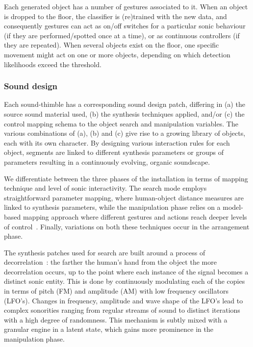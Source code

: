 \documentclass{nime-alternate}
\begin{document}
Each generated object has a number of gestures associated to it. When an object is dropped to the floor, the classifier is (re)trained with the new data, and consequently gestures can act as on/off switches for a particular sonic behaviour (if they are performed/spotted once at a time), or as continuous controllers (if they are repeated). When several objects exist on the floor, one specific movement might act on one or more objects, depending on which detection likelihoods exceed the threshold. 


\subsubsection{Sound design}


Each sound-thimble has a corresponding sound design patch, differing in (a) the source sound material used, (b) the synthesis techniques applied, and/or (c) the control mapping schema to the object search and manipulation variables. The various combinations of (a), (b) and (c) give rise to a growing library of objects, each with its own character. By designing various interaction rules for each object, segments are linked to different synthesis parameters or groups of parameters resulting in a continuously evolving, organic soundscape.

We differentiate between the three phases of the installation in terms of mapping technique and level of sonic interactivity. The search mode employs straightforward parameter mapping, where human-object distance measures are linked to synthesis parameters, while the manipulation phase relies on a model-based mapping approach where different gestures and actions reach deeper levels of control~\cite{hermann2011sonification}. Finally, variations on both these techniques occur in the arrangement phase.


The synthesis patches used for search are built around a process of decorrelation~\cite{101}: the farther the human's hand from the object the more decorrelation occurs, up to the point where each instance of the signal becomes a distinct sonic entity. This is done by continuously modulating each of the copies in terms of pitch (FM) and amplitude (AM) with low frequency oscillators (LFO’s). Changes in frequency, amplitude and wave shape of the LFO’s lead to complex sonorities ranging from regular streams of sound to distinct iterations with a high degree of randomness. %
This mechanism is subtly mixed with a granular engine in a latent state, which gains more prominence in the manipulation phase.
\end{document}
